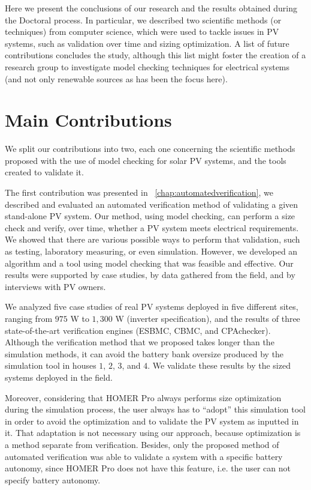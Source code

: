 Here we present the conclusions of our research and the results obtained during the Doctoral process. In particular, we described two scientific methods (or techniques) from computer science, which were used to tackle issues in PV systems, such as validation over time and sizing optimization. A list of future contributions concludes the study, although this list might foster the creation of a research group to investigate model checking techniques for electrical systems (and not only renewable sources as has been the focus here).

\section{Main Contributions}

We split our contributions into two, each one concerning the scientific methods proposed with the use of model checking for solar PV systems, and the tools created to validate it.

The first contribution was presented in ~\autoref{chap:automatedverification}, we described and evaluated an automated verification method of validating a given stand-alone PV system. Our method, using model checking, can perform a size check and verify, over time, whether a PV system meets electrical requirements. We showed that there are various possible ways to perform that validation, such as testing, laboratory measuring, or even simulation. However, we developed an algorithm and a tool using model checking that was feasible and effective. Our results were supported by case studies, by data gathered from the field, and by interviews with PV owners.

We analyzed five case studies of real PV systems deployed in five different sites, ranging from $975$ W to $1,300$ W (inverter specification), and the results of three state-of-the-art verification engines (ESBMC, CBMC, and CPAchecker). Although the verification method that we proposed takes longer than the simulation methods, it can avoid the battery bank oversize produced by the simulation tool in houses $1$, $2$, $3$, and $4$. We validate these results by the sized systems deployed in the field.

Moreover, considering that HOMER Pro always performs size optimization during the simulation process, the user always has to ``adopt'' this simulation tool in order to avoid the optimization and to validate the PV system as inputted in it. That adaptation is not necessary using our approach, because optimization is a method separate from verification. Besides, only the proposed method of automated verification was able to validate a system with a specific battery autonomy, since HOMER Pro does not have this feature, i.e. the user can not specify battery autonomy.

